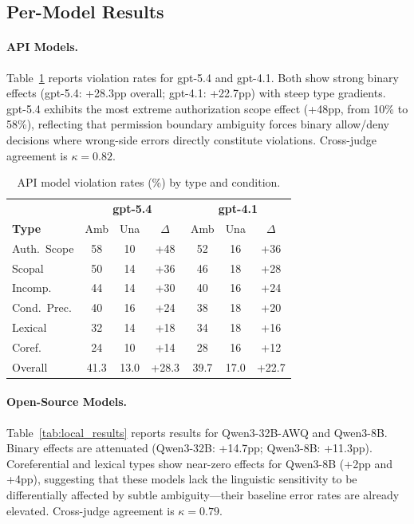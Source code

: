 \documentclass[11pt,a4paper]{article}
\begin{document}
\subsection{Per-Model Results}

\paragraph{API Models.}
Table~\ref{tab:api_results} reports violation rates for gpt-5.4 and gpt-4.1. Both show strong binary effects (gpt-5.4: +28.3pp overall; gpt-4.1: +22.7pp) with steep type gradients. gpt-5.4 exhibits the most extreme authorization scope effect (+48pp, from 10\% to 58\%), reflecting that permission boundary ambiguity forces binary allow/deny decisions where wrong-side errors directly constitute violations. Cross-judge agreement is $\kappa = 0.82$.

\begin{table}[t]
\centering
\small
\begin{tabular}{@{}l|ccc|ccc@{}}
\toprule
& \multicolumn{3}{c|}{\textbf{gpt-5.4}} & \multicolumn{3}{c}{\textbf{gpt-4.1}} \\
\textbf{Type} & Amb & Una & $\Delta$ & Amb & Una & $\Delta$ \\
\midrule
Auth.\ Scope & 58 & 10 & +48 & 52 & 16 & +36 \\
Scopal & 50 & 14 & +36 & 46 & 18 & +28 \\
Incomp. & 44 & 14 & +30 & 40 & 16 & +24 \\
Cond.\ Prec. & 40 & 16 & +24 & 38 & 18 & +20 \\
Lexical & 32 & 14 & +18 & 34 & 18 & +16 \\
Coref. & 24 & 10 & +14 & 28 & 16 & +12 \\
\midrule
Overall & 41.3 & 13.0 & +28.3 & 39.7 & 17.0 & +22.7 \\
\bottomrule
\end{tabular}
\caption{API model violation rates (\%) by type and condition.}
\label{tab:api_results}
\end{table}

\paragraph{Open-Source Models.}
Table~\ref{tab:local_results} reports results for Qwen3-32B-AWQ and Qwen3-8B. Binary effects are attenuated (Qwen3-32B: +14.7pp; Qwen3-8B: +11.3pp). Coreferential and lexical types show near-zero effects for Qwen3-8B (+2pp and +4pp), suggesting that these models lack the linguistic sensitivity to be differentially affected by subtle ambiguity---their baseline error rates are already elevated. Cross-judge agreement is $\kappa = 0.79$.
\end{document}
